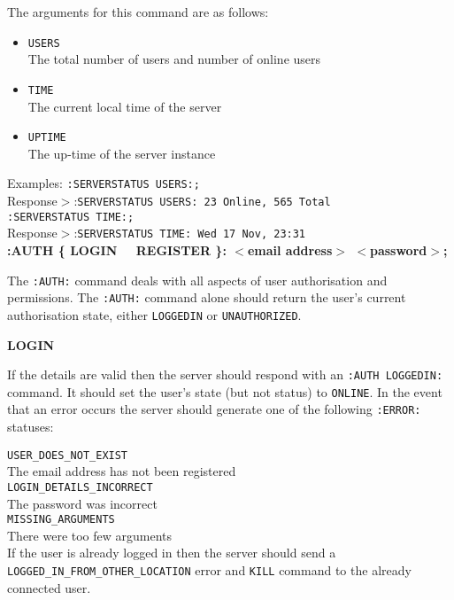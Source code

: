 The arguments for this command are as follows:

\begin{itemize}

\item{ \texttt{USERS} \\
The total number of users and number of online users}

\item{ \texttt{TIME} \\
The current local time of the server}

\item{ \texttt{UPTIME} \\
The up-time of the server instance}

\end{itemize}

Examples:
\texttt{:SERVERSTATUS USERS:;} \\
Response$>$:\texttt{SERVERSTATUS USERS: 23 Online, 565 Total} \\
\texttt{:SERVERSTATUS TIME:;} \\
Response$>$:\texttt{SERVERSTATUS TIME: Wed 17 Nov, 23:31} \\

{\bf :AUTH \{ LOGIN \ \vline \ REGISTER \}: $<$email address$>$ $<$password$>$;}

The \texttt{:AUTH:} command deals with all aspects of user authorisation and permissions. The \texttt{:AUTH:} command alone should return the user's current authorisation state, either \texttt{LOGGEDIN} or \texttt{UNAUTHORIZED}.

{\bf LOGIN}

If the details are valid then the server should respond with an \texttt{:AUTH LOGGEDIN:} command. It should set the user's state (but not status) to \texttt{ONLINE}.
In the event that an error occurs the server should generate one of the following \texttt{:ERROR:} statuses:

\texttt{USER\_DOES\_NOT\_EXIST}\\
The email address has not been registered \\
\texttt{LOGIN\_DETAILS\_INCORRECT} \\
The password was incorrect \\
\texttt{MISSING\_ARGUMENTS} \\
There were too few arguments \\

If the user is already logged in then the server should send a \texttt{LOGGED\_IN\_FROM\_OTHER\_LOCATION} error and \texttt{KILL} command to the already connected user.


